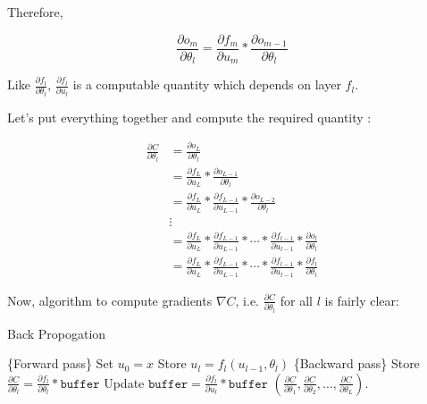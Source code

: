\documentclass[a4paper]{tufte-handout}
\begin{document}
Therefore,

\begin{equation}
\frac{\partial o_m}{\partial \theta_l} = \frac{\partial f_m}{\partial u_m} * \frac{\partial o_{m-1}}{\partial \theta_l}
\label{eq:6}
\end{equation}

Like \(\frac{\partial f_l}{\partial \theta_l}\),
\(\frac{\partial f_l}{\partial u_l}\) is a computable quantity which
depends on layer \(f_l\).

\noindent Let's put everything together and compute the required quantity
:

\begin{align*}
\frac{\partial C}{\partial \theta_l} &= \frac{\partial o_L}{\partial \theta_l}\\
&= \frac{\partial f_L}{\partial u_L} * \frac{\partial o_{L-1}}{\partial \theta_l}\\
&= \frac{\partial f_L}{\partial u_L} * \frac{\partial f_{L-1}}{\partial u_{L-1}} * \frac{\partial o_{L-2}}{\partial \theta_l} \\
&\vdots \\
&= \frac{\partial f_L}{\partial u_L} * \frac{\partial f_{L-1}}{\partial u_{L-1}} * \cdots * \frac{\partial f_{l-1}}{\partial u_{l-1}} * \frac{\partial o_l}{\partial \theta_l}\\
&= \frac{\partial f_L}{\partial u_L} * \frac{\partial f_{L-1}}{\partial u_{L-1}} * \cdots * \frac{\partial f_{l-1}}{\partial u_{l-1}} * \frac{\partial f_l}{\partial \theta_l}
\end{align*}

Now, algorithm to compute gradients \(\nabla C\), i.e.
\(\frac{\partial C}{\partial \theta_l}\) for all \(l\) is fairly clear:

\begin{algorithm}[H]
\caption{Back Propogation}
\begin{algorithmic}[1]
  \STATE \{Forward pass\}
  \STATE Set \(u_0 = x\)
  	\STATE Store \(u_l = f_l(u_{l-1}, \theta_l)\)
  \ENDFOR
  \STATE \{Backward pass\}
  	\STATE Store \(\frac{\partial C}{\partial \theta_l} = \frac{\partial f_l}{\partial \theta_l} * \texttt{buffer}\)
  	\STATE Update \(\texttt{buffer} = \frac{\partial f_l}{\partial u_l} * \texttt{buffer}\)
  \ENDFOR 
  \RETURN \(\left(\frac{\partial C}{\partial\theta_1}, \frac{\partial C}{\partial\theta_2}, \ldots, \frac{\partial C}{\partial\theta_L}\right)\).
\end{algorithmic}
\end{algorithm}
\end{document}
